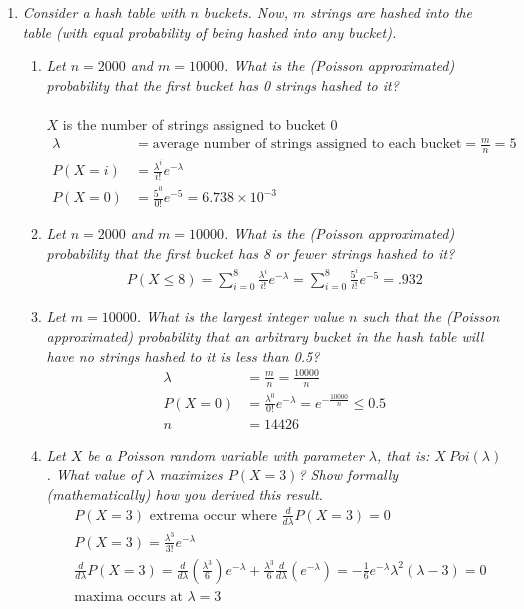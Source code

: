 \documentclass{article} %
\begin{document}
\begin{enumerate}
	\item \textit{Consider a hash table with $n$ buckets. Now, $m$ strings are hashed into the table (with equal probability of being hashed into any bucket).}
	\begin{enumerate}
		\item \textit{Let $n = 2000$ and $m = 10000$. What is the (Poisson approximated) probability that the first bucket has 0 strings hashed to it?}\\
		\\
		$X$ is the number of strings assigned to bucket 0
		\begin{align*}
		\lambda &= \text{average number of strings assigned to each bucket} = \frac{m}{n} = 5\\
		P(X = i) &= \frac{\lambda^i}{i!}e^{-\lambda}\\
		P(X = 0) &= \frac{5^0}{0!}e^{-5} = 6.738 \times 10^{-3}
		\end{align*}
		
		\item \textit{Let $n = 2000$ and $m = 10000$. What is the (Poisson approximated) probability that the first bucket has 8 or fewer strings hashed to it?}
		\begin{align*}
		P(X \leq 8) = \sum_{i=0}^{8} \frac{\lambda^i}{i!}e^{-\lambda} = \sum_{i=0}^{8} \frac{5^i}{i!}e^{-5} = .932
		\end{align*}
		
		\item \textit{Let $m = 10000$. What is the largest integer value $n$ such that the (Poisson approximated) probability that an arbitrary bucket in the hash table will have no strings hashed to it is less than 0.5?}
		\begin{align*}
		\lambda &= \frac{m}{n} = \frac{10000}{n}\\
		P(X = 0) &= \frac{\lambda^0}{0!}e^{-\lambda} = e^{-\frac{10000}{n}} \leq 0.5\\
		n &= 14426
		\end{align*}
		
		\item \textit{Let $X$ be a Poisson random variable with parameter $\lambda$, that is: $X ~ Poi(\lambda)$. What value of $\lambda$ maximizes $P(X = 3)$? Show formally (mathematically) how you derived this result.}
		\begin{align*}
		&P(X = 3) \text{ extrema occur where } \frac{d}{d\lambda} P(X = 3) = 0\\
		&P(X = 3) = \frac{\lambda^3}{3!}e^{-\lambda}\\
		&\frac{d}{d\lambda} P(X = 3) = \frac{d}{d\lambda}(\frac{\lambda^3}{6})e^{-\lambda} + \frac{\lambda^3}{6}\frac{d}{d\lambda}(e^{-\lambda}) = -\frac{1}{6}e^{-\lambda}\lambda^2(\lambda - 3) = 0\\
		&\text{maxima occurs at } \lambda = 3	
		\end{align*}
	

\end{enumerate}
\end{enumerate}
\end{document}
